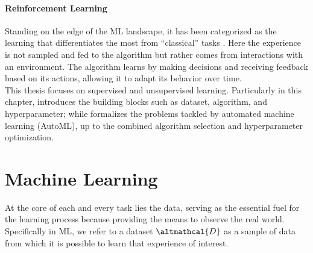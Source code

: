 \paragraph{Reinforcement Learning}
Standing on the edge of the ML landscape, it has been categorized as the learning that differentiates the most from ``classical'' tasks \cite{sutton2018reinforcement}.
Here the experience is not sampled and fed to the algorithm but rather comes from interactions with an environment.
The algorithm learns by making decisions and receiving feedback based on its actions, allowing it to adapt its behavior over time.\\

This thesis focuses on supervised and unsupervised learning.
Particularly in this chapter,  introduces the building blocks such as dataset, algorithm, and hyperparameter; while
 formalizes the problems tackled by automated machine learning (AutoML), up to the combined algorithm selection and hyperparameter optimization.

\section{Machine Learning}\label{automl-background-sec:ml}

At the core of each and every task lies the data, serving as the essential fuel for the learning process because providing the means to observe the real world.
Specifically in ML, we refer to a dataset $\altmathcal{D}$ as a sample of data from which it is possible to learn that experience of interest.


